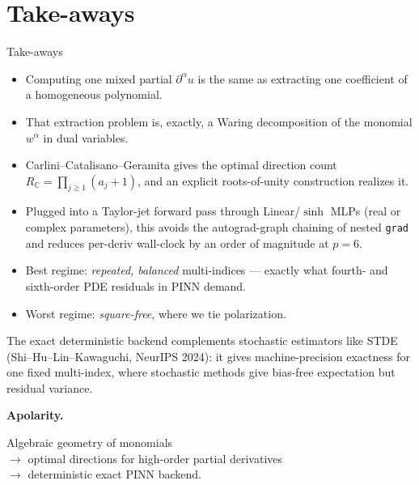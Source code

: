 \documentclass[10pt,aspectratio=169]{beamer}
\newcommand{\C}{\mathbb{C}}
\newcommand{\dal}{\partial^\alpha}
\begin{document}
\section{Take-aways}

\begin{frame}{Take-aways}
  \begin{itemize}
    \item Computing one mixed partial $\dal u$ is the same as extracting one
          coefficient of a homogeneous polynomial.
    \item That extraction problem is, exactly, a Waring decomposition of the
          monomial $w^\alpha$ in dual variables.
    \item Carlini--Catalisano--Geramita gives the optimal direction count
          $R_\C = \prod_{j\ge1}(a_j+1)$, and an explicit roots-of-unity
          construction realizes it.
    \item Plugged into a Taylor-jet forward pass through Linear/$\sinh$
          MLPs (real or complex parameters), this avoids the
          autograd-graph chaining of nested \texttt{grad} and reduces
          per-deriv wall-clock by an order of magnitude at $p=6$.
    \item Best regime: \emph{repeated, balanced} multi-indices --- exactly
          what fourth- and sixth-order PDE residuals in PINN demand.
    \item Worst regime: \emph{square-free}, where we tie polarization.
  \end{itemize}

  \pause
  \medskip
  \alert{The exact deterministic backend complements stochastic estimators
  like STDE (Shi--Hu--Lin--Kawaguchi, NeurIPS 2024): it gives machine-precision
  exactness for one fixed multi-index, where stochastic methods give
  bias-free expectation but residual variance.}
\end{frame}

\begin{frame}[standout]
  \begin{center}
  {\Large\bfseries Apolarity.}

  \medskip
  Algebraic geometry of monomials \\
  $\to$ optimal directions for high-order partial derivatives \\
  $\to$ deterministic exact PINN backend.
  \end{center}
\end{frame}
\end{document}

